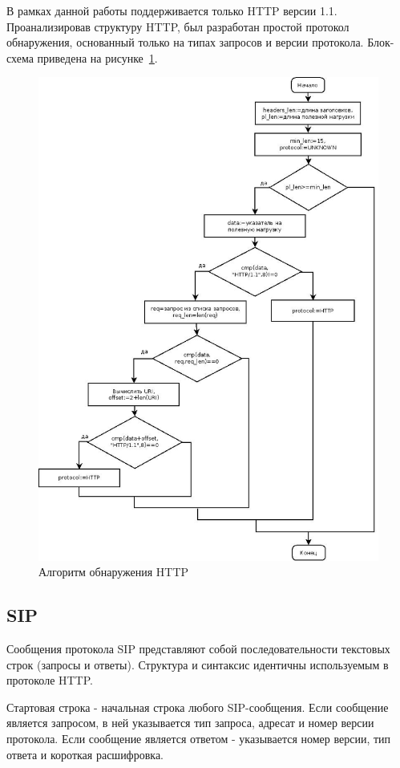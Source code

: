 В рамках данной работы поддерживается только HTTP версии 1.1. Проанализировав структуру HTTP, был разработан простой протокол обнаружения, основанный только на типах запросов и версии протокола. Блок-схема приведена на рисунке~\ref{pic:http_alg}.
\begin{figure}
\centering
\includegraphics[scale=0.45]{pictures/http_alg}
\caption{Алгоритм обнаружения HTTP}
\label{pic:http_alg}
\end{figure}

\subsection{SIP}
Сообщения протокола SIP представляют собой последовательности текстовых строк (запросы и ответы). Структура и синтаксис идентичны используемым в протоколе HTTP.

Стартовая строка - начальная строка любого SIP-сообщения. Если сообщение является запросом, в ней указывается тип запроса, адресат и номер версии протокола. Если сообщение является ответом - указывается номер версии, тип ответа и короткая расшифровка.

